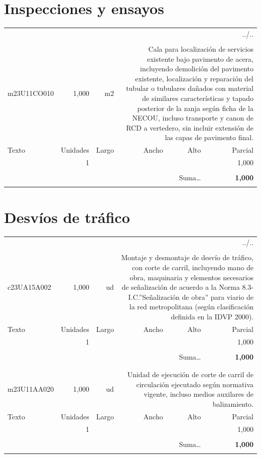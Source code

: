 \documentclass{book}%
\begin{document}
%
\section{Inspecciones y ensayos}%
\begin{longtable}{lrrrrr}%
\multicolumn{6}{r}{../..}\\%
\endfoot%
\endlastfoot%
&&&&&\\%
m23U11CO010&     1,000& m2&\multicolumn{3}{p{6cm}}{\scriptsize Cala para localización de servicios existente bajo pavimento de acera, incluyendo demolición del pavimento existente, localización y reparación del tubular o tubulares dañados con material de similares características y tapado posterior de la zanja según ficha de la NECOU, incluso transporte y canon de RCD a vertedero, sin incluir extensión de las capas de pavimento final.\normalsize}\\%
Texto&Unidades&Largo&Ancho&Alto&Parcial\\%
\hline%
\multicolumn{1}{p{3.5cm}}{ }&1&&&&     1,000\\%
&&&&&\\%
\multicolumn{5}{r}{Suma\ldots}&\textbf{     1,000}\\%
\hline%
&&&&&\\%
\end{longtable}%
\newpage

%
\section{Desvíos de tráfico}%
\begin{longtable}{lrrrrr}%
\multicolumn{6}{r}{../..}\\%
\endfoot%
\endlastfoot%
&&&&&\\%
c23UA15A002&     1,000& ud&\multicolumn{3}{p{6cm}}{\scriptsize Montaje y desmontaje de desvío de tráfico, con corte de carril, incluyendo mano de obra, maquinaria y elementos necesarios de señalización de acuerdo a la Norma 8.3-I.C.”Señalización de obra” para viario de la red metropolitana (según clasificación definida en la IDVP 2000).\normalsize}\\%
Texto&Unidades&Largo&Ancho&Alto&Parcial\\%
\hline%
\multicolumn{1}{p{3.5cm}}{ }&1&&&&     1,000\\%
&&&&&\\%
\multicolumn{5}{r}{Suma\ldots}&\textbf{     1,000}\\%
\hline%
&&&&&\\%
&&&&&\\%
m23U11AA020&     1,000& ud&\multicolumn{3}{p{6cm}}{\scriptsize Unidad de ejecución de corte de carril de circulación ejecutado según normativa vigente, incluso medios auxilares de balizamiento.\normalsize}\\%
Texto&Unidades&Largo&Ancho&Alto&Parcial\\%
\hline%
\multicolumn{1}{p{3.5cm}}{ }&1&&&&     1,000\\%
&&&&&\\%
\multicolumn{5}{r}{Suma\ldots}&\textbf{     1,000}\\%
\hline%
&&&&&\\%
\end{longtable}%
\newpage
\end{document}
